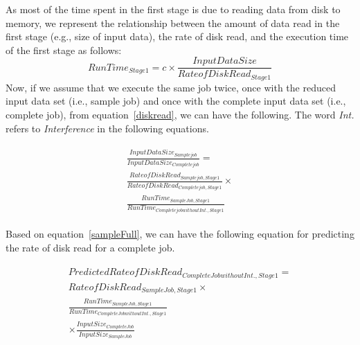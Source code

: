 \noindent 
As most of the time spent in the first stage is due to reading data from disk to memory, we represent the relationship between the amount of data read in the first stage (e.g., size of input data), the rate of disk read, and the execution time of the first stage as follows: 
\begin{equation}
\label{diskread}
RunTime_{Stage 1}=c \times \frac{Input Data Size}{Rate of DiskRead_{Stage 1}} \end{equation}
\noindent 
Now, if we assume that we execute the same job twice, once with the reduced input data set (i.e., sample job) and once with the complete input data set (i.e., complete job), from equation~\ref{diskread}, we can have the following. The word {\textit{Int.}} refers to {\textit{Interference}} in the following equations. 


\begin{eqnarray}
\label{sampleFull}
\begin{gathered}
\frac{InputDataSize_{Sample job}}{InputDataSize_{Complete job}} = \\
\frac{Rate of Disk Read_{Sample job, Stage 1}}{RateofDiskRead_{Complete job, Stage 1}} \times \\
\frac{RunTime_{Sample Job, Stage 1}}{RunTime_{Complete job without Int., Stage 1}}
\end{gathered}
\end{eqnarray}


Based on equation~\ref{sampleFull}, we can have the following equation for predicting the rate of disk read for a complete job. 


\begin{eqnarray}
\label{fullDiskIORead}
\begin{gathered}
Predicted Rate of Disk Read_{Complete Job without Int., Stage1}  = \\
Rate of Disk Read_{Sample Job, Stage 1} \times \\
\frac{RunTime_{Sample Job, Stage 1}}{RunTime_{Complete Job without Int., Stage 1}} \\
\times \frac{Input Size_{Complete Job}}{Input Size_{Sample Job}}
\end{gathered}
\end{eqnarray}


